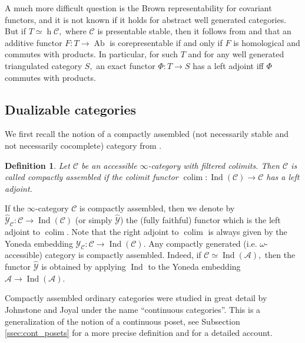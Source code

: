 \documentclass[11pt,leqno]{amsart}
\newtheorem{defi}[theo]{Definition}
\numberwithin{equation}{section}
\def\h{\operatorname{h}}
\DeclareMathOperator*{\colim}{colim}
\newcommand{\cA}{{\mathcal A}}
\newcommand{\cC}{{\mathcal C}}
\newcommand{\cY}{{\mathcal Y}}
\newcommand{\Ab}{\operatorname{Ab}}
\newcommand{\Ind}{\operatorname{Ind}}
\begin{document}
A much more difficult question is the Brown representability for covariant functors, and it is not known if it holds for abstract well generated categories. But if $T\simeq \h\cC,$ where $\cC$ is presentable stable, then it follows from \cite[Theorems 1.11, 1.17 and 1.22]{Nee09} and \cite[Proposition A.3.7.6]{Lur09} that an additive functor $F:T\to\Ab$ is corepresentable if and only if $F$ is homological and commutes with products. In particular, for such $T$ and for any well generated triangulated category $S,$ an exact functor $\Phi:T\to S$ has a left adjoint iff $\Phi$ commutes with products.

\subsection{Dualizable categories}
\label{ssec:dualizable_cats}


We first recall the notion of a compactly assembled (not necessarily stable and not necessarily cocomplete) category from \cite{Lur18}.

\begin{defi} Let $\cC$ be an accessible $\infty$-category with filtered colimits. Then $\cC$ is called compactly assembled if the colimit functor $\colim:\Ind(\cC)\to\cC$ has a left adjoint.\end{defi}

If the $\infty$-category $\cC$ is compactly assembled, then we denote by $\hat{\cY}_{\cC}:\cC\to \Ind(\cC)$ (or simply $\hat{\cY}$) the (fully faithful) functor which is the left adjoint to $\colim.$ Note that the right adjoint to $\colim$ is always given by the Yoneda embedding $\cY_{\cC}:\cC\to\Ind(\cC).$ Any compactly generated (i.e. $\omega$-accessible) category is compactly assembled. Indeed, if $\cC\simeq\Ind(\cA),$ then the functor $\hat{\cY}$ is obtained by applying $\Ind$ to the Yoneda embedding $\cA\to\Ind(\cA).$

Compactly assembled ordinary categories were studied in great detail by Johnstone and Joyal \cite{JJ} under the name ``continuous categories''. This is a generalization of the notion of a continuous poset, see Subsection \ref{ssec:cont_posets} for a more precise definition and  \cite{GHKLMS, BH81} for a detailed account.
\end{document}
